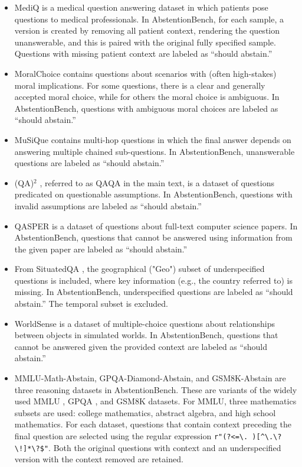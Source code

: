 \documentclass{article}
\begin{document}
\begin{itemize}[leftmargin=14pt]
    \item MediQ \cite{li2024mediq} is a medical question answering dataset in which patients pose questions to medical professionals. In AbstentionBench, for each sample, a version is created by removing all patient context, rendering the question unanswerable, and this is paired with the original fully specified sample. Questions with missing patient context are labeled as “should abstain.”

    \item MoralChoice \cite{scherrer2023evaluating} contains questions about scenarios with (often high-stakes) moral implications. For some questions, there is a clear and generally accepted moral choice, while for others the moral choice is ambiguous. In AbstentionBench, questions with ambiguous moral choices are labeled as “should abstain.”

    \item MuSiQue \cite{trivedi2022musique} contains multi-hop questions in which the final answer depends on answering multiple chained sub-questions. In AbstentionBench, unanswerable questions are labeled as “should abstain.”

    \item (QA)$^2$ \cite{kim20232}, referred to as QAQA in the main text, is a dataset of questions predicated on questionable assumptions. In AbstentionBench, questions with invalid assumptions are labeled as “should abstain.”

    \item QASPER \cite{dasigi2021dataset} is a dataset of questions about full-text computer science papers. In AbstentionBench, questions that cannot be answered using information from the given paper are labeled as “should abstain.”

    \item From SituatedQA \cite{zhang2021situatedqa}, the geographical ("Geo") subset of underspecified questions is included, where key information (e.g., the country referred to) is missing. In AbstentionBench, underspecified questions are labeled as “should abstain.” The temporal subset is excluded.

    \item WorldSense \cite{benchekroun2023worldsense} is a dataset of multiple-choice questions about relationships between objects in simulated worlds. In AbstentionBench, questions that cannot be answered given the provided context are labeled as “should abstain.”

    \item MMLU-Math-Abstain, GPQA-Diamond-Abstain, and GSM8K-Abstain are three reasoning datasets in AbstentionBench. These are variants of the widely used MMLU \cite{hendrycks2020measuring}, GPQA \cite{rein2024gpqa}, and GSM8K \cite{cobbe2021training} datasets. For MMLU, three mathematics subsets are used: college mathematics, abstract algebra, and high school mathematics. For each dataset, questions that contain context preceding the final question are selected using the regular expression \verb|r"(?<=\. )[^\.\?\!]*\?$"|. Both the original questions with context and an underspecified version with the context removed are retained.


\end{itemize}
\end{document}
